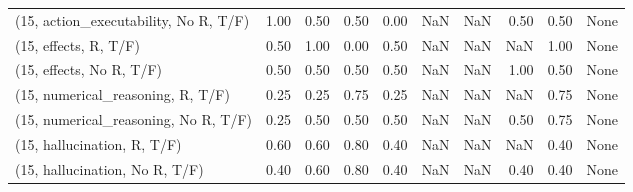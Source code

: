 \begin{table*}[h!]
\begin{adjustbox}{width=2\columnwidth,center}
\begin{tabular}{lrrr|rrr|rrr}
(15, action\_executability, No R, T/F) &                      1.00 &                  0.50 &                      0.50 &                          0.00 &                       NaN &                           NaN &                                   0.50 &                               0.50 &                                  None \\
(15, effects, R, T/F)                 &                      0.50 &                  1.00 &                      0.00 &                          0.50 &                       NaN &                           NaN &                                    NaN &                               1.00 &                                  None \\
(15, effects, No R, T/F)              &                      0.50 &                  0.50 &                      0.50 &                          0.50 &                       NaN &                           NaN &                                   1.00 &                               0.50 &                                  None \\
(15, numerical\_reasoning, R, T/F)     &                      0.25 &                  0.25 &                      0.75 &                          0.25 &                       NaN &                           NaN &                                    NaN &                               0.75 &                                  None \\
(15, numerical\_reasoning, No R, T/F)  &                      0.25 &                  0.50 &                      0.50 &                          0.50 &                       NaN &                           NaN &                                   0.50 &                               0.75 &                                  None \\
(15, hallucination, R, T/F)           &                      0.60 &                  0.60 &                      0.80 &                          0.40 &                       NaN &                           NaN &                                    NaN &                               0.40 &                                  None \\
(15, hallucination, No R, T/F)        &                      0.40 &                  0.60 &                      0.80 &                          0.40 &                       NaN &                           NaN &                                   0.40 &                               0.40 &                                  None \\

\end{tabular}
\end{adjustbox}
\end{table*}
